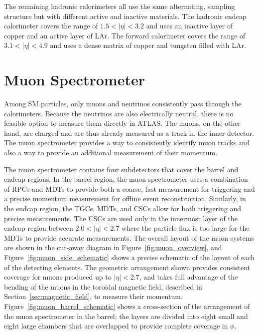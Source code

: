 The remaining hadronic calorimeters all use the same alternating, sampling structure but with different active and inactive materials.
The hadronic endcap calorimeter covers the range of $1.5 < |\eta| < 3.2$ and uses an inactive layer of copper and an active layer of \acl{LAr}.
The forward calorimeter covers the range of $3.1 < |\eta| < 4.9$ and uses a dense matrix of copper and tungsten filled with \acl{LAr}. 


\section{Muon Spectrometer}

Among \ac{SM} particles, only muons and neutrinos consistently pass through the calorimeters.
Because the neutrinos are also electrically neutral, there is no feasible option to measure them directly in \ac{ATLAS}.
The muons, on the other hand, are charged and are thus already measured as a track in the inner detector.
The muon spectrometer provides a way to consistently identify muon tracks and also a way to provide an additional measurement of their momentum.

The muon spectrometer contains four subdetectors that cover the barrel and endcap regions.
In the barrel region, the muon spectrometer uses a combination of \acp{RPC} and \acp{MDT} to provide both a coarse, fast measurement for triggering and a precise momentum measurement for offline event reconstruction.
Similarly, in the endcap region, the \acp{TGC}, \acp{MDT}, and \acp{CSC} allow for both triggering and precise measurements.
The \acp{CSC} are used only in the innermost layer of the endcap region between $2.0 < |\eta| < 2.7$ where the particle flux is too large for the \acp{MDT} to provide accurate measurements.
The overall layout of the muon systems are shown in the cut-away diagram in Figure~\ref{fig:muon_overview}, and Figure~\ref{fig:muon_side_schematic} shows a precise schematic of the layout of each of the detecting elements.
The geometric arrangement shown provides consistent coverage for muons produced up to $|\eta| < 2.7$, and takes full advantage of the bending of the muons in the toroidal magnetic field, described in Section~\ref{sec:magnetic_field}, to measure their momentum.
Figure~\ref{fig:muon_barrel_schematic} shows a cross-section of the arrangement of the muon spectrometer in the barrel; the layers are divided into eight small and eight large chambers that are overlapped to provide complete coverage in $\phi$. 


